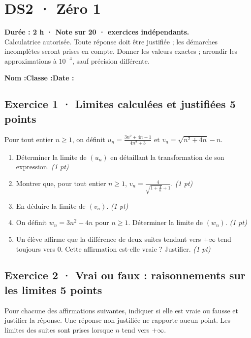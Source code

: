 \mxnewpage{}\label{sujet:2-1}

\section*{DS2 · Zéro 1}


\textbf{Durée : 2 h · Note sur 20 ·  exercices indépendants.}\\Calculatrice autorisée. Toute réponse doit être justifiée ; les démarches incomplètes seront prises en compte. Donner les valeurs exactes ; arrondir les approximations à $10^{-4}$, sauf précision différente.

\smallskip\textbf{Nom :}\enspace\dotfill\quad\textbf{Classe :}\enspace\dotfill\quad\textbf{Date :}\enspace\dotfill

\subsection*{Exercice 1 · Limites calculées et justifiées \hfill 5 points}Pour tout entier $n\ge1$, on définit $u_n=\frac{3n^2+4n-1}{4n^2+3}$ et $v_n=\sqrt{n^2+4n}-n$.

\begin{enumerate}

\item Déterminer la limite de $(u_n)$ en détaillant la transformation de son expression. \hfill\textit{(1 pt)}

\item Montrer que, pour tout entier $n\ge1$, $v_n=\frac{4}{\sqrt{1+\frac{4}n}+1}$. \hfill\textit{(1 pt)}

\item En déduire la limite de $(v_n)$. \hfill\textit{(1 pt)}

\item On définit $w_n=3n^2-4n$ pour $n\ge1$. Déterminer la limite de $(w_n)$. \hfill\textit{(1 pt)}

\item Un élève affirme que la différence de deux suites tendant vers $+\infty$ tend toujours vers $0$. Cette affirmation est-elle vraie ? Justifier. \hfill\textit{(1 pt)}

\end{enumerate}

\subsection*{Exercice 2 · Vrai ou faux : raisonnements sur les limites \hfill 5 points}Pour chacune des affirmations suivantes, indiquer si elle est vraie ou fausse et justifier la réponse. Une réponse non justifiée ne rapporte aucun point. Les limites des suites sont prises lorsque $n$ tend vers $+\infty$.

